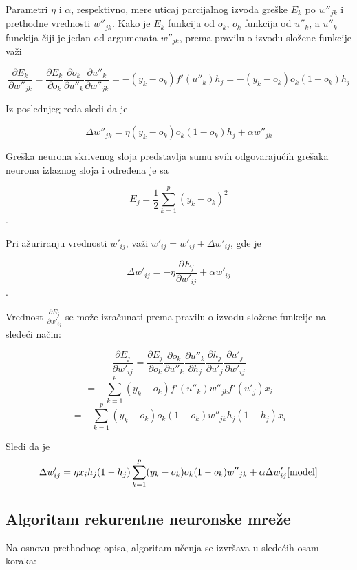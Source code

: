 \documentclass[a4paper]{article}
\begin{document}
Parametri $\eta{}$ i $\alpha{}$, respektivno, mere uticaj parcijalnog izvoda greške $E_k$ po $w{''}_{jk}$ i prethodne vrednosti $w{''}_{jk}$. Kako je $E_k$ funkcija od $o_k$, $o_k$ funkcija od $u{''}_k$, a $u{''}_k$ funckija čiji je jedan od argumenata $w{''}_{jk}$, prema pravilu o izvodu složene funkcije važi 

$$\frac{\partial{}E_k}{\partial{}w{''}_{jk}} = \frac{\partial{}E_k}{\partial{}o_{k}}\frac{\partial{}o_k}{\partial{}u{''}_{k}}\frac{\partial{}u{''}_k}{\partial{}w{''}_{jk}} = -(y_k-o_k)f'(u{''}_k)h_j = -(y_k-o_k)o_k(1-o_k)h_j$$

Iz poslednjeg reda sledi da je 

$$\Delta{}w{''}_{jk}=\eta{}(y_k-o_k)o_k(1-o_k)h_j+\alpha{}w{''}_{jk}$$

Greška neurona skrivenog sloja predstavlja sumu svih odgovarajućih grešaka neurona izlaznog sloja i određena je sa

$$E_j = \frac{1}{2}\sum_{k=1}^p(y_k - o_k)^2$$.

Pri ažuriranju vrednosti $w'_{ij}$, važi $w'_{ij}=w'_{ij} + \Delta{}w'_{ij}$, gde je

$$\Delta{}{}w'_{ij} = - \eta{}\frac{\partial{}E_j}{\partial{}w{'}_{ij}}+\alpha{}w'_{ij}$$.

Vrednost $\frac{\partial{}E_j}{\partial{}w'_{ij}}$ se može izračunati prema pravilu o izvodu složene funkcije na sledeći način:

$$\frac{\partial{}E_j}{\partial{}w'_{ij}}=\frac{\partial{}E_j}{\partial{}o_{k}}\frac{\partial{}o_k}{\partial{}u{''}_{k}}\frac{\partial{}u{''}_k}{\partial{}h_{j}}\frac{\partial{}h_j}{\partial{}u'_{j}}\frac{\partial{}u'_j}{\partial{}w'_{ij}}$$
$$ = -\sum_{k=1}^p(y_k-o_k)f'(u{''}_k)w{''}_{jk}f'(u'_j)x_i$$
$$ = -\sum_{k=1}^p(y_k-o_k)o_k(1-o_k)w{''}_{jk}h_j(1-h_j)x_i$$

Sledi da je 
$$\Delta{}w'_{ij}=\eta{}x_ih_j(1-h_j)\sum_{k=1}^p(y_k-o_k)o_k(1-o_k)w{''}_{jk} + \alpha{}\Delta{}w'_{ij}\cite{model}$$

\subsection{Algoritam rekurentne neuronske mreže}
\label{sec:model}

Na osnovu prethodnog opisa, algoritam učenja se izvršava u sledećih osam koraka\cite{model}:
\end{document}
